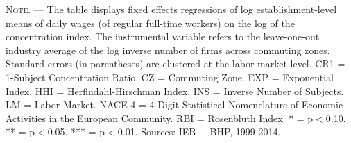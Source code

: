\documentclass[11pt,oneside,reqno,xcolor=dvipsnames]{article} %
\begin{document}
\begin{appendix}
\begin{refsection}
\begin{landscape}
\begin{table}[!ht]
{\begin{threeparttable}
\begin{tablenotes}
\item \footnotesize \textsc{Note. ---} The table displays fixed effects regressions of log establishment-level means of daily wages (of regular full-time workers) on the log of the concentration index. The instrumental variable refers to the leave-one-out industry average of the log inverse number of firms across commuting zones. Standard errors (in parentheses) are clustered at the labor-market level. CR1 = 1-Subject Concentration Ratio. CZ = Commuting Zone. EXP = Exponential Index. HHI = Herfindahl-Hirschman Index. INS = Inverse Number of Subjects. LM = Labor Market. NACE-4 = 4-Digit Statistical Nomenclature of Economic Activities in the European Community. RBI = Rosenbluth Index. * = p$<$0.10. ** = p$<$0.05. *** = p$<$0.01. Sources: IEB $\plus$ BHP, 1999-2014.
\end{tablenotes}
\end{threeparttable}
}
\end{table}




\vspace*{\fill}
\clearpage
\vspace*{\fill}




\end{landscape}
\end{refsection}
\end{appendix}
\end{document}
